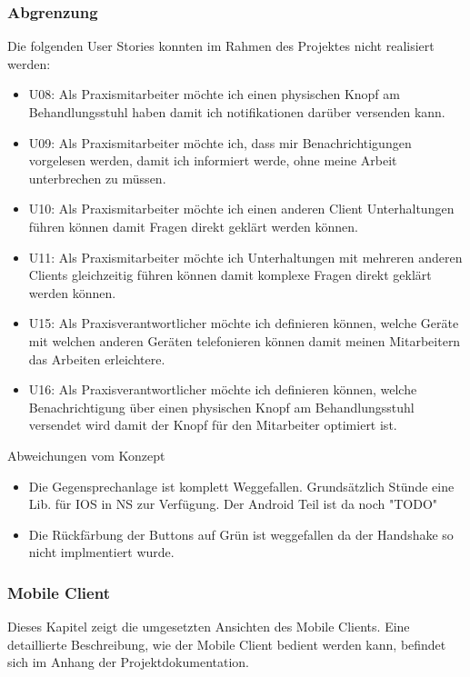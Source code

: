 \subsubsection{Abgrenzung}

Die folgenden User Stories konnten im Rahmen des Projektes nicht realisiert werden:

\begin{itemize}
    \item U08: Als Praxismitarbeiter möchte ich einen physischen Knopf am Behandlungsstuhl haben damit ich notifikationen darüber versenden kann.
    \item U09: Als Praxismitarbeiter möchte ich, dass mir Benachrichtigungen vorgelesen werden, damit ich informiert werde, ohne meine Arbeit unterbrechen zu müssen.
    \item U10: Als Praxismitarbeiter möchte ich einen anderen Client Unterhaltungen führen können damit Fragen direkt geklärt werden können.
    \item U11: Als Praxismitarbeiter möchte ich Unterhaltungen mit mehreren anderen Clients gleichzeitig führen können damit komplexe Fragen direkt geklärt werden können.
    \item U15: Als Praxisverantwortlicher möchte ich definieren können, welche Geräte mit welchen anderen Geräten telefonieren können damit meinen Mitarbeitern das Arbeiten erleichtere.
    \item U16: Als Praxisverantwortlicher möchte ich definieren können, welche Benachrichtigung über einen physischen Knopf am Behandlungsstuhl versendet wird damit der Knopf für den Mitarbeiter optimiert ist.
\end{itemize}


Abweichungen vom Konzept
\begin{itemize}
    \item Die Gegensprechanlage ist komplett Weggefallen.
    \subitem Grundsätzlich Stünde eine Lib. für IOS in NS zur Verfügung. Der Android Teil ist da noch "TODO"
    \item Die Rückfärbung der Buttons auf Grün ist weggefallen da der Handshake so nicht implmentiert wurde.
\end{itemize}

\clearpage
\subsubsection{Mobile Client}\label{subsec:mobile-client-realisation}

Dieses Kapitel zeigt die umgesetzten Ansichten des Mobile Clients.
Eine detaillierte Beschreibung, wie der Mobile Client bedient werden kann, befindet sich im Anhang der Projektdokumentation.

